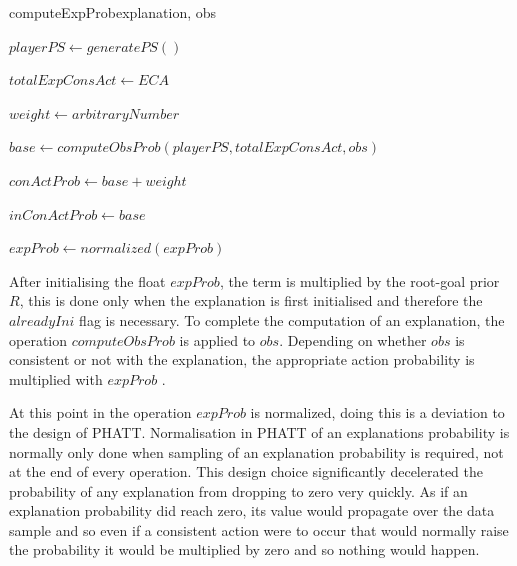 \documentclass[parskip]{cs4rep}
\begin{document}
\begin{pseudocode}[ruled]{computeExpProb}{explanation, obs}
\begin{algorithm}[H]


$playerPS \gets generatePS()$

$totalExpConsAct \gets ECA$

$weight \gets arbitraryNumber$ \newline

$base \gets computeObsProb(playerPS, totalExpConsAct, obs)$ 

$conActProb \gets base + weight$

$inConActProb \gets base$ \newline


$expProb \gets normalized(expProb)$

\end{algorithm}
\end{pseudocode}

After initialising the float $expProb$, the term is multiplied by the root-goal prior $R$, this is done only when the explanation is first initialised and therefore the $alreadyIni$ flag is necessary. To complete the computation of an explanation, the operation $computeObsProb$ is applied to $obs$. Depending on whether $obs$ is consistent or not with the explanation, the appropriate action probability is multiplied with $expProb$ .

At this point in the operation $expProb$ is normalized, doing this is a deviation to the design of PHATT. Normalisation in PHATT of an explanations probability is normally only done when sampling of an explanation probability is required, not at the end of every operation. This design choice significantly decelerated the probability of any explanation from dropping to zero very quickly. As if an explanation probability did reach zero, its value would propagate over the data sample and so even if a consistent action were to occur that would normally raise the probability it would be multiplied by zero and so nothing would happen. 
\end{document}
